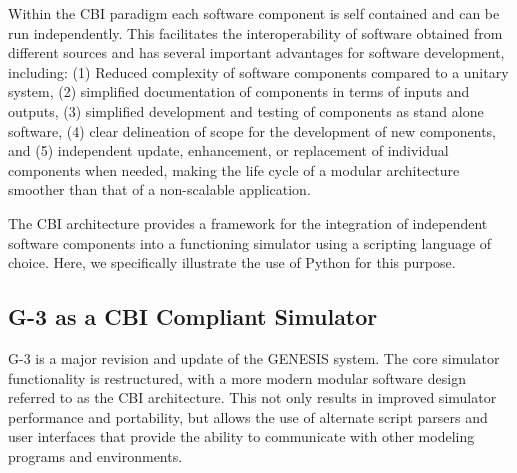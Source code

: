 \documentclass[10pt]{article}
\begin{document}
Within the CBI paradigm each software component is self contained and
can be run independently. This facilitates the interoperability of
software obtained from different sources and has several important
advantages for software development, including: (1) Reduced complexity
of software components compared to a unitary system, (2) simplified
documentation of components in terms of inputs and outputs, (3) simplified development and testing of components as stand
alone software, (4) clear delineation of scope for the development
of new components, and (5)
independent update, enhancement, or
replacement of individual components when needed, making the life cycle of a modular architecture
smoother than that of a non-scalable application.

The CBI architecture provides a framework for the
integration of independent software components into a functioning
simulator using a scripting language of choice.  Here, we specifically
illustrate the use of Python for this purpose.

\subsection*{G-3 as a CBI Compliant Simulator}

G-3 is a major revision and update of the GENESIS system.  The core
simulator functionality is restructured, with a more modern modular software
design referred to as the CBI architecture. This not
only results in improved simulator performance and portability, but
allows the use of alternate script parsers and user interfaces that provide the ability to communicate with other modeling programs and
environments.
\end{document}
